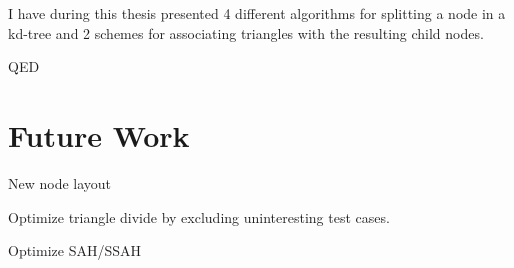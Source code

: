 
I have during this thesis presented 4 different algorithms for splitting a node
in a kd-tree and 2 schemes for associating triangles with the resulting child
nodes.


QED








\chapter{Future Work}\label{chp:future}


New node layout

Optimize triangle divide by excluding uninteresting test cases.

Optimize SAH/SSAH





